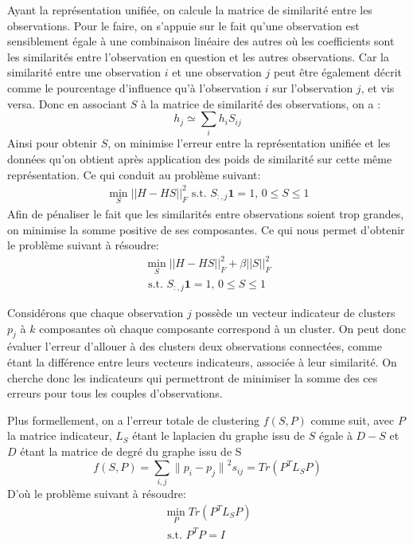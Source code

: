 \documentclass[12pt, french, latin.medieval, a4paper]{report}
\begin{document}
    Ayant la représentation unifiée, on calcule la matrice de similarité entre les observations.
    Pour le faire, on s'appuie sur le fait qu'une observation est sensiblement égale à une combinaison linéaire des autres où les coefficients sont les similarités entre l'observation en question et les autres observations.
    Car la similarité entre une observation $i$ et une observation $j$ peut être également décrit comme le pourcentage d'influence qu'à l'observation $i$ sur l'observation $j$, et vis versa.
    Donc en associant $S$ à la matrice de similarité des observations, on a :
	\begin{equation*}
   	 h_j \simeq \sum_i h_iS_{ij}
    \end{equation*}
    Ainsi pour obtenir $S$, on minimise l'erreur entre la représentation unifiée et les données qu'on obtient après application des poids de similarité sur cette même représentation.
    Ce qui conduit au problème suivant:
    \begin{equation*}
   	 \begin{aligned}
   		 \min_{S} {|| H - HS ||}_F^2 \text{  s.t. $S_{:,j}\textbf{1}=1$, $0\leq S \leq1$}
   	 \end{aligned}
    \end{equation*}
    Afin de pénaliser le fait que les similarités entre observations soient trop grandes, on minimise la somme positive de ses composantes.
    Ce qui nous permet d'obtenir le problème suivant à résoudre:
    \begin{equation}
   	 \begin{aligned}
   		 \min_{S} {|| H - HS ||}_F^2 + \beta {|| S ||}_F^2 \\
   		 \text{  s.t. $S_{:,j}\textbf{1}=1$, $0\leq S \leq1$}
   	 \end{aligned}
   	 \label{equa:mcles5}
    \end{equation}

    Considérons que chaque observation $j$ possède un vecteur indicateur de clusters $p_j$ à $k$ composantes où chaque composante correspond à un cluster.
	On peut donc évaluer l'erreur d'allouer à des clusters deux observations connectées, comme étant la différence entre leurs vecteurs indicateurs, associée à leur similarité.
	On cherche donc les indicateurs qui permettront de minimiser la somme des ces erreurs pour tous les couples d'observations.

	Plus formellement, on a l'erreur totale de clustering $f(S, P)$ comme suit, avec
    $P$ la matrice indicateur,
    $L_S$ étant le laplacien du graphe issu de $S$ égale à $D - S$ et
    $D$ étant la matrice de degré du graphe issu de S
	\begin{equation*}
   	 f(S, P) = \sum_{i,j} {\|p_i-p_j\|}^2s_{ij} = Tr(P^TL_SP)
    \end{equation*}
	D'où le problème suivant à résoudre:
    \begin{equation}
   	 \begin{aligned}
   		 \min_{P} Tr(P^TL_SP) \\ \text{  s.t. $P^TP =I$}
   	 \end{aligned}
   	 \label{equa:mcles6}
    \end{equation}
\end{document}
